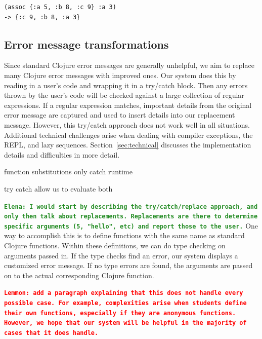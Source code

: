 \documentclass[12pt]{article}
\newcommand{\comment}[1]{{\bf \tt  {#1}}}
\newcommand{\emcomment}[1]{\textcolor{ForestGreen}{\comment{Elena: {#1}}}}
\newcommand{\alcomment}[1]{\textcolor{red}{\comment{Lemmon: {#1}}}}
\begin{document}
\begin{verbatim}
(assoc {:a 5, :b 8, :c 9} :a 3)
-> {:c 9, :b 8, :a 3}
\end{verbatim}


\subsection{Error message transformations}\label{sec:transform}

Since standard Clojure error messages are generally unhelpful, we aim to replace many Clojure error messages with improved ones.
Our system does this by reading in a user's code and wrapping it in a try/catch block.
Then any errors thrown by the user's code will be checked against a large collection of regular expressions.
If a regular expression matches, important details from the original error message are captured and used to insert details into our replacement message.
However, this try/catch approach does not work well in all situations.
Additional technical challenges arise when dealing with compiler exceptions, the REPL, and lazy sequences.
Section~\ref{sec:technical} discusses the implementation details and difficulties in more detail.

function substitutions only catch runtime

try catch allow us to evaluate both

\emcomment{I would start by describing the try/catch/replace approach, and only then talk about replacements. Replacements are there to determine specific arguments (5, "hello", etc) and report those to the user.}
One way to accomplish this is to define functions with the same name as standard Clojure functions.
Within these definitions, we can do type checking on arguments passed in.
If the type checks find an error, our system displays a customized error message.
If no type errors are found, the arguments are passed on to the actual corresponding Clojure function.

\alcomment{add a paragraph explaining that this does not handle every possible case. For example, complexities arise when students define their own functions, especially if they are anonymous functions. However, we hope that our system will be helpful in the majority of cases that it does handle.}
\end{document}
